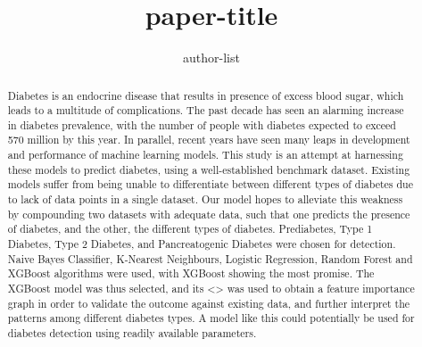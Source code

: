 \documentclass{article}
\title{paper-title}
\author{author-list}
\begin{document}
\maketitle

\begin{abstract}
	Diabetes is an endocrine disease that results in presence of excess blood sugar, which leads to a multitude of complications. The past decade has seen an alarming increase in diabetes prevalence, with the number of people with diabetes expected to exceed 570 million by this year. 
	In parallel, recent years have seen many leaps in development and performance of machine learning models. This study is an attempt at harnessing these models to predict diabetes, using a well-established benchmark dataset.
	Existing models suffer from being unable to differentiate between different types of diabetes due to lack of data points in a single dataset. Our model hopes to alleviate this weakness by compounding two datasets with adequate data, such that one predicts the presence of diabetes, and the other, the different types of diabetes. Prediabetes, Type 1 Diabetes, Type 2 Diabetes, and Pancreatogenic Diabetes were chosen for detection.
	Naive Bayes Classifier, K-Nearest Neighbours, Logistic Regression, Random Forest and XGBoost algorithms were used, with XGBoost showing the most promise.
	The XGBoost model was thus selected, and its <> was used to obtain a feature importance graph in order to validate the outcome against existing data, and further interpret the patterns among different diabetes types.
	A model like this could potentially be used for diabetes detection using readily available parameters.
\end{abstract}



% 
% 
\end{document}
